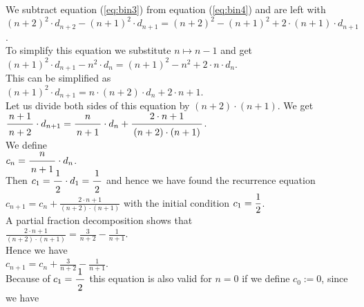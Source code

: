 We subtract equation  (\ref{eq:bin3}) from equation (\ref{eq:bin4})
and are left with \\[0.2cm]
\hspace*{1.3cm} 
$(n+2)^2 \cdot d_{n+2} - (n+1)^2 \cdot d_{n+1} = (n+2)^2 - (n+1)^2 + 2 \cdot (n+1) \cdot d_{n+1}$.
\\[0.2cm]
To simplify this equation we substitute  $n \mapsto n - 1$ and get \\[0.2cm]
\hspace*{1.3cm} 
$(n+1)^2 \cdot d_{n+1} - n^2 \cdot d_{n} = (n+1)^2 - n^2 + 2 \cdot n \cdot d_{n}$.
\\[0.2cm]
This can be simplified as \\[0.2cm]
\hspace*{1.3cm} $(n+1)^2 \cdot d_{n+1}  =  n \cdot (n + 2) \cdot d_{n} + 2 \cdot n + 1$. \\[0.2cm]
Let us divide both sides of this equation by $(n+2)\cdot (n+1)$.  We get \\[0.2cm]
\hspace*{1.3cm}  
$\displaystyle \bruch{n+1}{n+2} \cdot d_{n+1}  =  \bruch{n}{n + 1} \cdot d_{n} + \bruch{2 \cdot n + 1}{(n+2)\cdot (n+1)}$. \\[0.2cm]
We define \\[0.2cm]
\hspace*{1.3cm} $\displaystyle c_n = \bruch{n}{n+1} \cdot d_n$. \\[0.4cm]
Then $c_1 = \bruch{1}{2} \cdot d_1 = \bruch{1}{2}$ and hence we have found the recurrence equation \\[0.2cm]
\hspace*{1.3cm} 
$\displaystyle c_{n+1}  =  c_{n} + \frac{2 \cdot n + 1}{(n+2)\cdot (n+1)}$ \quad with the initial condition $\displaystyle c_1 = \frac{1}{2}$.
\\[0.2cm]
A partial fraction decomposition shows that \\[0.2cm]
\hspace*{1.3cm} 
$\displaystyle \frac{2 \cdot n + 1}{(n+2)\cdot (n+1)} = \frac{3}{n+2} - \frac{1}{n+1}$. \\[0.2cm]
Hence we have \\[0.2cm]
\hspace*{1.3cm} $\displaystyle c_{n+1} = c_n +  \frac{3}{n+2} - \frac{1}{n+1}$. \\[0.2cm]
Because of $c_1 = \bruch{1}{2}$ this equation is also valid for  $n=0$ if we define $c_0 := 0$, since
we have
\\[0.2cm]
\hspace*{1.3cm}
